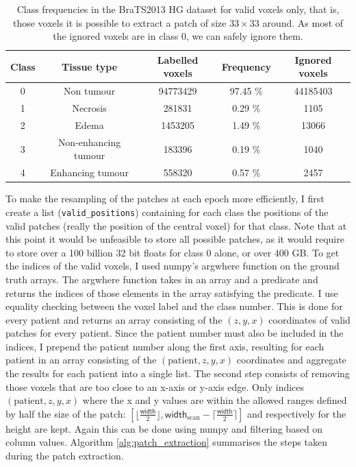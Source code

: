 \documentclass[12pt,a4paper,twoside,openright]{report}
\begin{document}
\begin{enumerate}
		\begin{table}[h]
		\centering	
		\begin{tabular}{c c S[table-format=9.0] S[table-format=2.2] S[table-format=8.0]}
		\textbf{Class} & \textbf{Tissue type} & \textbf{Labelled voxels} & \textbf{Frequency} & \textbf{Ignored voxels}\\
		  & Non tumour 				& 94773429 	& 97.45 \% & 44185403 \\ 
		1 & Necrosis 				& 281831 	& 0.29 \% & 1105\\ 
		2 & Edema					& 1453205 	& 1.49 \% & 13066\\ 
		3 & Non-enhancing tumour 	& 183396 	& 0.19 \% & 1040\\ 
		4 & Enhancing tumour		& 558320 	& 0.57 \% & 2457\\
		\end{tabular}
		\caption{Class frequencies in the BraTS2013 HG dataset for valid voxels only, that is, those voxels it is possible to extract a patch of size $33 \times 33$ around. As most of the ignored voxels are in class 0, we can safely ignore them.}
		\label{table:valid_class_frequencies}
		\end{table}
\end{enumerate}

To make the resampling of the patches at each epoch more efficiently, I first create a list (\texttt{valid\_positions}) containing for each class the positions of the valid patches (really the position of the central voxel) for that class. Note that at this point it would be unfeasible to store all possible patches, as it would require to store over a 100 billion 32 bit floats for class 0 alone, or over 400 GB. To get the indices of the valid voxels, I used numpy's argwhere function on the ground truth arrays. The argwhere function takes in an array and a predicate and returns the indices of those elements in the array satisfying the predicate. I use equality checking between the voxel label and the class number. This is done for every patient and returns an array consisting of the $(z, y, x)$ coordinates of valid patches for every patient. Since the patient number must also be included in the indices, I prepend the patient number along the first axis, resulting for each patient in an array consisting of the $(\text{patient}, z, y, x)$ coordinates and aggregate the results for each patient into a single list. The second step consists of removing those voxels that are too close to an x-axis or y-axis edge. Only indices $(\text{patient}, z, y, x)$ where the x and y values are  within the allowed ranges defined by half the size of the patch: $[\lfloor \frac{\textsf{width}}{2} \rfloor, \textsf{width}_{\text{scan}} - \lceil \frac{\textsf{width}}{2} \rceil]$ and respectively for the height are kept. Again this can be done using numpy and filtering based on column values. Algorithm \ref{alg:patch_extraction} summarises the steps taken during the patch extraction.
\end{document}
